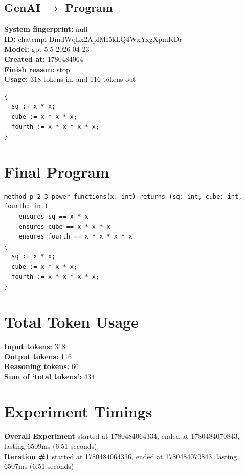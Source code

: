 \documentclass{article}
\begin{document}
\subsection*{GenAI $\rightarrow$ Program}
\textbf{System fingerprint: }null
\\\textbf{ID: }chatcmpl-DmdWqLx2ApIMI5kLQ4WxYxgXpmKDr
\\\textbf{Model: }gpt-5.5-2026-04-23
\\\textbf{Created at: }1780484064
\\\textbf{Finish reason: }stop
\\\textbf{Usage: }318 tokens in, and 116 tokens out
\begin{lstlisting}
{
  sq := x * x;
  cube := x * x * x;
  fourth := x * x * x * x;
}
\end{lstlisting}
\section*{Final Program}
\begin{lstlisting}
method p_2_3_power_functions(x: int) returns (sq: int, cube: int, fourth: int)
	ensures sq == x * x
	ensures cube == x * x * x
	ensures fourth == x * x * x * x
{
  sq := x * x;
  cube := x * x * x;
  fourth := x * x * x * x;
}
\end{lstlisting}
\section*{Total Token Usage}
\textbf{Input tokens: }318
\\\textbf{Output tokens: }116
\\\textbf{Reasoning tokens: }66
\\\textbf{Sum of `total tokens': }434
\section*{Experiment Timings}
\textbf{Overall Experiment} started at 1780484064334, ended at 1780484070843, lasting 6509ms (6.51 seconds)
\\\textbf{Iteration \#1} started at 1780484064336, ended at 1780484070843, lasting 6507ms (6.51 seconds)
\end{document}
